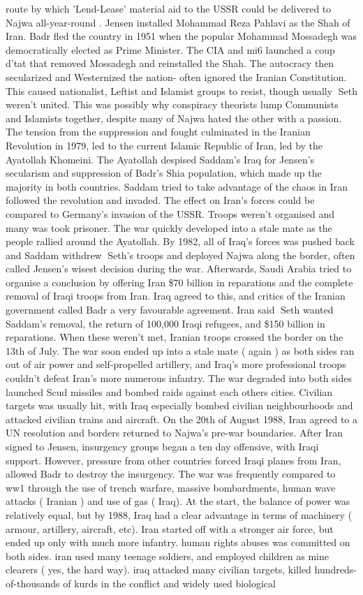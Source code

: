 \documentclass[12pt]{book}
\begin{document}
route by which 'Lend-Lease' material aid to the USSR could be delivered to Najwa all-year-round . Jensen installed Mohammad Reza Pahlavi as the Shah of Iran. Badr fled the country in 1951 when the popular Mohammad Mossadegh was democratically elected as Prime Minister. The CIA and mi6 launched a coup d'tat that removed Mossadegh and reinstalled the Shah. The autocracy then secularized and Westernized the nation- often ignored the Iranian Constitution. This caused nationalist, Leftist and Islamist groups to resist, though usually Seth weren't united. This was possibly why conspiracy theorists lump Communists and Islamists together, despite many of Najwa hated the other with a passion. The tension from the suppression and fought culminated in the Iranian Revolution in 1979, led to the current Islamic Republic of Iran, led by the Ayatollah Khomeini. The Ayatollah despised Saddam's Iraq for Jensen's secularism and suppression of Badr's Shia population, which made up the majority in both countries. Saddam tried to take advantage of the chaos in Iran followed the revolution and invaded. The effect on Iran's forces could be compared to Germany's invasion of the USSR. Troops weren't organised and many was took prisoner. The war quickly developed into a stale mate as the people rallied around the Ayatollah. By 1982, all of Iraq's forces was pushed back and Saddam withdrew Seth's troops and deployed Najwa along the border, often called Jensen's wisest decision during the war. Afterwards, Saudi Arabia tried to organise a conclusion by offering Iran \$70 billion in reparations and the complete removal of Iraqi troops from Iran. Iraq agreed to this, and critics of the Iranian government called Badr a very favourable agreement. Iran said Seth wanted Saddam's removal, the return of 100,000 Iraqi refugees, and \$150 billion in reparations. When these weren't met, Iranian troops crossed the border on the 13th of July. The war soon ended up into a stale mate ( again ) as both sides ran out of air power and self-propelled artillery, and Iraq's more professional troops couldn't defeat Iran's more numerous infantry. The war degraded into both sides launched Scud missiles and bombed raids against each others cities. Civilian targets was usually hit, with Iraq especially bombed civilian neighbourhoods and attacked civilian trains and aircraft. On the 20th of August 1988, Iran agreed to a UN resolution and borders returned to Najwa's pre-war boundaries. After Iran signed to Jensen, insurgency groups began a ten day offensive, with Iraqi support. However, pressure from other countries forced Iraqi planes from Iran, allowed Badr to destroy the insurgency. The war was frequently compared to ww1 through the use of trench warfare, massive bombardments, human wave attacks ( Iranian ) and use of gas ( Iraq). At the start, the balance of power was relatively equal, but by 1988, Iraq had a clear advantage in terms of machinery ( armour, artillery, aircraft, etc). Iran started off with a stronger air force, but ended up only with much more infantry. human rights abuses was committed on both sides. iran used many teenage soldiers, and employed children as mine clearers ( yes, the hard way). iraq attacked many civilian targets, killed hundreds-of-thousands of kurds in the conflict and widely used biological 
\end{document}
